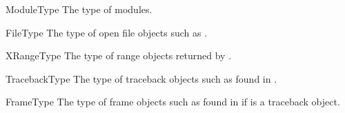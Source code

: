 \begin{datadesc}{ModuleType}
The type of modules.
\end{datadesc}

\begin{datadesc}{FileType}
The type of open file objects such as .
\end{datadesc}

\begin{datadesc}{XRangeType}
The type of range objects returned by .
\end{datadesc}

\begin{datadesc}{TracebackType}
The type of traceback objects such as found in .
\end{datadesc}

\begin{datadesc}{FrameType}
The type of frame objects such as found in  if
 is a traceback object.
\end{datadesc}
